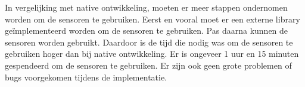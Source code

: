 In vergelijking met native ontwikkeling, moeten er meer stappen ondernomen worden om de 
sensoren te gebruiken. Eerst en vooral moet er een externe library geïmplementeerd worden 
om de sensoren te gebruiken. Pas daarna kunnen de sensoren worden gebruikt. Daardoor is de tijd die nodig
was om de sensoren te gebruiken hoger dan bij native ontwikkeling. Er is ongeveer
1 uur en 15 minuten gespendeerd om de sensoren te gebruiken. Er zijn ook geen grote problemen of
bugs voorgekomen tijdens de implementatie.
